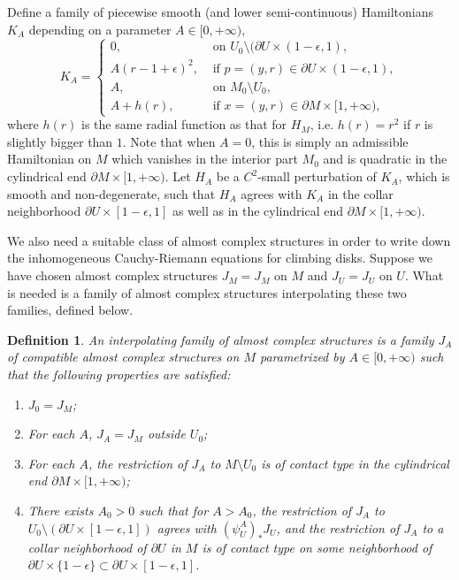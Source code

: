 \documentclass{amsart}
\newtheorem{definition}[theorem]{Definition}
\numberwithin{equation}{section}
\numberwithin{figure}{section}
\begin{document}
Define a family of piecewise smooth (and lower semi-continuous) Hamiltonians $K_{A}$ depending on a parameter $A \in [0, +\infty)$,
\begin{equation}
K_{A} =
\begin{cases}
0, & \text{ on } U_{0} \setminus (\partial U \times (1-\epsilon, 1),\\
A(r-1+\epsilon)^{2}, &\text{ if } p = (y, r) \in \partial U \times (1-\epsilon, 1),\\
A, & \text{ on } M_{0} \setminus U_{0},\\
A + h(r), & \text{ if } x = (y, r) \in \partial M \times [1, +\infty),
\end{cases}
\end{equation}
where $h(r)$ is the same radial function as that for $H_{M}$, i.e. $h(r) = r^{2}$ if $r$ is slightly bigger than $1$. Note that when $A = 0$, this is simply an admissible Hamiltonian on $M$ which vanishes in the interior part $M_{0}$ and is quadratic in the cylindrical end $\partial M \times [1, +\infty)$. Let $H_{A}$ be a $C^{2}$-small perturbation of $K_{A}$, which is smooth and non-degenerate, such that $H_{A}$ agrees with $K_{A}$ in the collar neighborhood $\partial U \times [1-\epsilon, 1]$ as well as in the cylindrical end $\partial M \times [1, +\infty)$. \par
	We also need a suitable class of almost complex structures in order to write down the inhomogeneous Cauchy-Riemann equations for climbing disks. Suppose we have chosen almost complex structures $J_{M} = J_{M}$ on $M$ and $J_{U} = J_{U}$ on $U$. What is needed is a family of almost complex structures interpolating these two families, defined below. \par

\begin{definition}\label{interpolating family of almost complex structures}
	An interpolating family of almost complex structures is a family $J_{A}$ of compatible almost complex structures on $M$ parametrized by $A \in [0, +\infty)$ such that the following properties are satisfied:
\begin{enumerate}[label=(\roman*)]
	
\item $J_{0} = J_{M}$;

\item For each $A$, $J_{A} = J_{M}$ outside $U_{0}$;

\item For each $A$, the restriction of $J_{A}$ to $M \setminus U_{0}$ is of contact type in the cylindrical end $\partial M \times [1, +\infty)$;

\item There exists $A_{0} > 0$ such that for $A > A_{0}$, the restriction of $J_{A}$ to $U_{0} \setminus (\partial U \times [1-\epsilon, 1])$ agrees with $(\psi_{U}^{A})_{*}J_{U}$, and the restriction of $J_{A}$ to a collar neighborhood of $\partial U$ in $M$ is of contact type on some neighborhood of $\partial U \times \{1-\epsilon\} \subset \partial U \times [1-\epsilon, 1]$.

\end{enumerate}

\end{definition}
\end{document}

